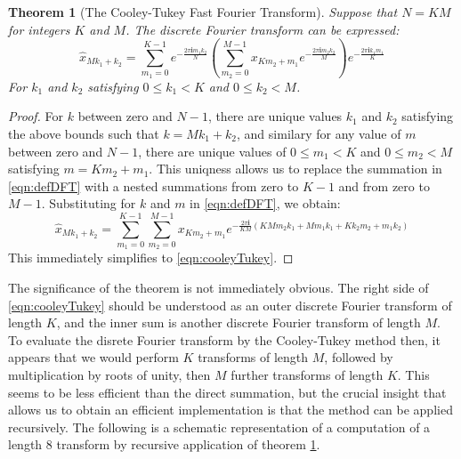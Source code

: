 \documentclass{article}
\newcommand{\ii}{\mathbf{i}}
\newtheorem{theorem}{Theorem}[section]
\theoremstyle{definition}
\begin{document}
\begin{theorem}[The Cooley-Tukey Fast Fourier Transform]\label{thm:CT}
Suppose that $N = KM$ for integers $K$ and $M$. The discrete Fourier transform
can be expressed:
\begin{equation}\label{eqn:cooleyTukey}
  \hat{x}_{Mk_1 + k_2} = \sum_{m_1 = 0}^{K-1} e^{-\frac{2 \pi \ii m_1 k_2}{N}}
\left( \sum_{m_2 = 0}^{M-1} x_{Km_2 + m_1} e^{-\frac{2 \pi \ii m_2 k_2}{M}}
\right) e^{-\frac{2 \pi \ii k_1 m_1}{K}}
\end{equation}
For $k_1$ and $k_2$ satisfying $0 \leq k_1 < K$ and $0 \leq k_2 < M$.
\end{theorem}
\begin{proof}
For $k$ between zero and $N-1$, there are unique values $k_1$ and $k_2$
satisfying the above bounds such that $k = Mk_1 + k_2$, and similary for any
value of $m$ between zero and $N - 1$, there are unique values of $0 \leq m_1 < K$
and $0 \leq m_2 < M$ satisfying $m = Km_2 + m_1$. This uniqness allows us to
replace the summation in \eqref{eqn:defDFT} with a nested summations from zero to
$K-1$ and from zero to $M-1$. Substituting for $k$ and $m$ in
\eqref{eqn:defDFT}, we obtain:
\begin{displaymath}
  \hat{x}_{Mk_1 + k_2} = \sum_{m_1 = 0}^{K-1} \sum_{m_2 = 0}^{M-1} x_{Km_2 +
m_1} e^{-\frac{2 \pi \ii}{KM}(KMm_2k_1 + Mm_1 k_1 + K k_2 m_2 + m_1 k_2)}
\end{displaymath}
This immediately simplifies to \eqref{eqn:cooleyTukey}.
\end{proof}

The significance of the theorem is not immediately obvious. The right side of
\eqref{eqn:cooleyTukey} should be understood as an outer discrete Fourier
transform of length $K$, and the inner sum is another discrete Fourier transform
of length $M$. To evaluate the disrete Fourier transform by the Cooley-Tukey
method then, it appears that we would perform $K$ transforms of length $M$,
followed by multiplication by roots of unity, then $M$ further transforms of
length $K$. This seems to be less efficient than the direct summation, but the
crucial insight that allows us to obtain an efficient implementation is that the
method can be applied recursively. The following is a schematic representation
of a computation of a length $8$ transform by recursive application of theorem
\ref{thm:CT}.
\end{document}
